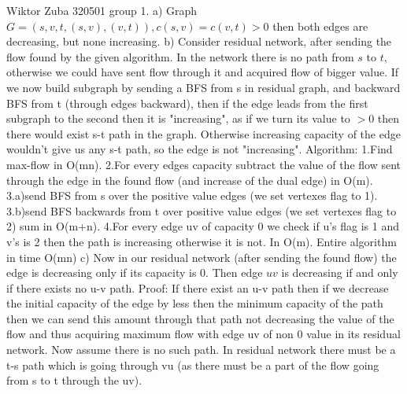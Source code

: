 \documentclass{article}
\begin{document}
Wiktor Zuba 320501 group 1.
\newline\newline
a) Graph $G=({s,v,t},{(s,v),(v,t)}), c(s,v)=c(v,t)>0$ then both edges are decreasing, but none increasing.\newline\newline
b)
Consider residual network, after sending the flow found by the given algorithm. In the network there is no path from $s$ to $t$,
otherwise we could have sent flow through it and acquired flow of bigger value. If we now build subgraph by sending a BFS from s in residual graph,
and backward BFS from t (through edges backward), then if the edge leads from the first subgraph to the second then it is "increasing",
as if we turn its value to $>0$ then there would exist s-t path in the graph. Otherwise increasing capacity of the edge wouldn't give us any s-t path, so the edge is not "increasing".\newline
Algorithm:\newline
1.Find max-flow in O(mn).\newline
2.For every edges capacity subtract the value of the flow sent through the edge in the found flow (and increase of the dual edge) in O(m).\newline
3.a)send BFS from s over the positive value edges (we set vertexes flag to 1).\newline
3.b)send BFS backwards from t over positive value edges (we set vertexes flag to 2) sum in O(m+n).\newline
4.For every edge uv of capacity 0 we check if u's flag is 1 and v's is 2 then the path is increasing otherwise it is not. In O(m).\newline
Entire algorithm in time O(mn)\newline\newline
c)
Now in our residual network (after sending the found flow) the edge is decreasing only if its capacity is 0. Then edge $uv$ is decreasing if and only if there exists no u-v path.\newline
Proof: If there exist an u-v path then if we decrease the initial capacity of the edge by less then the minimum capacity of the path then we can send this
amount through that path not decreasing the value of the flow and thus acquiring maximum flow with edge uv of non 0 value in its residual network.\newline
Now assume there is no such path. In residual network there must be a t-s path which is going through vu (as there must be a part of the flow going from s to t through the uv).
\end{document}
